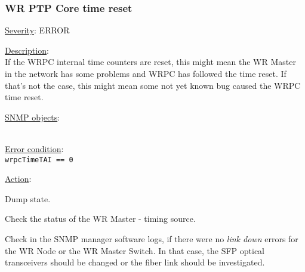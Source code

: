 \subsubsection{\bf WR PTP Core time reset}
		\label{fail:other:time_reset}
		\begin{pck_descr}
			\item [] \underline{Severity}: ERROR
			\item [] \underline{Description}:\\
				If the WRPC internal time counters are reset, this might mean the WR
				Master in the network has some problems and WRPC has followed the time
				reset. If that's not the case, this might mean some not yet known bug
				caused the WRPC time reset.
			\item [] \underline{SNMP objects}:\\
				{\footnotesize
				\\
				 }
			\item [] \underline{Error condition}:\\
				{\footnotesize
				\texttt{wrpcTimeTAI == 0} }
      \item [] \underline{Action}:
        \begin{pck_proc}
        \item Dump state.
        \item Check the status of the WR Master - timing source.
        \item Check in the SNMP manager software logs, if there were no
          \emph{link down} errors for the WR Node or the WR Master Switch. In
          that case, the SFP optical transceivers should be changed or the fiber
          link should be investigated.
        \end{pck_proc}
		\end{pck_descr}

